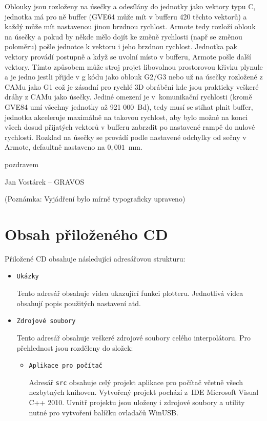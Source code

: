 \documentclass [a4paper,11pt,oneside,notitlepage,openright]{report} %
\begin{document}
\begin{appendix}
Oblouky  jsou rozloženy na úsečky a odesílány do jednotky jako vektory typu C, jednotka má pro ně buffer (GVE64 může mít v bufferu 420 těchto vektorů) a každý může mít nastavenou jinou brzdnou rychlost. Armote tedy rozloží oblouk na úsečky a pokud by někde mělo dojít ke změně rychlosti (např se změnou poloměru) pošle jednotce k vektoru i jeho brzdnou rychlost. Jednotka pak vektory provádí postupně a když se uvolní místo v bufferu, Armote pošle další vektory. Tímto způsobem může stroj projet libovolnou prostorovou křivku plynule a je jedno jestli přijde v g kódu jako oblouk G2/G3 nebo už na úsečky rozložené z CAMu jako G1 což je zásadní pro rychlé 3D obrábění kde jsou prakticky veškeré dráhy z CAMu jako úsečky. Jediné omezení je v~komunikační rychlosti (kromě GVE84 umí všechny jednotky až 921 000~Bd), tedy musí se stíhat plnit buffer, jednotka akceleruje maximálně na takovou rychlost, aby bylo možné na konci všech dosud přijatých vektorů v bufferu zabrzdit po nastavené rampě do nulové rychlosti. Rozklad na úsečky se provádí podle nastavené odchylky od sečny v Armote, defaultně nastaveno na $0,001$~mm.

\hfill pozdravem

\hfill Jan Vostárek -- GRAVOS



(Poznámka: Vyjádření bylo mírně typograficky upraveno)


\chapter{Obsah přiloženého CD}
Přiložené CD obsahuje následující adresářovou strukturu:
\begin{itemize}
	\item {\tt Ukázky}
	
	Tento adresář obsahuje videa ukazující funkci plotteru. Jednotlivá videa obsahují popis použitých nastavení atd.
	\item {\tt Zdrojové soubory}
	
	Tento adresář obsahuje veškeré zdrojové soubory celého interpolátoru. Pro přehlednost jsou rozděleny do složek:
	\begin{itemize}
		\item {\tt Aplikace pro počítač}
		
		Adresář {\tt src} obsahuje celý projekt aplikace pro počítač včetně všech nezbytných knihoven. Vytvořený projekt pochází z~IDE Microsoft Visual C++ 2010. Uvnitř projektu jsou uloženy i zdrojové soubory a utility nutné pro vytvoření balíčku ovladačů WinUSB.
		

\end{itemize}
\end{itemize}
\end{appendix}
\end{document}
